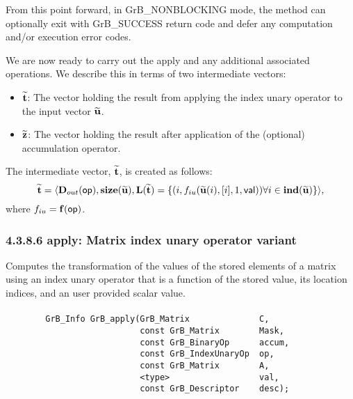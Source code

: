 From this point forward, in {\sf GrB\_NONBLOCKING} mode, the method can 
optionally exit with {\sf GrB\_SUCCESS} return code and defer any computation 
and/or execution error codes.

We are now ready to carry out the apply and any additional 
associated operations.  We describe this in terms of two intermediate vectors:
\begin{itemize}
    \item ${\bf \widetilde{t}}$: The vector holding the result from applying the index unary operator to the input vector
    ${\bf \widetilde{u}}$.
    \item ${\bf \widetilde{z}}$: The vector holding the result after 
    application of the (optional) accumulation operator.
\end{itemize}

{\color{red}
The intermediate vector, ${\bf \widetilde{t}}$, is created as follows:
\[
{\bf \widetilde{t}} = \langle
\mbox{$\mathbf{D}_{out}$}({\sf op}), \bold{size}({\bf \widetilde{u}}),
\bold{L}({\bf \widetilde{t}}) =
\{(i,f_{iu}({\bf \widetilde{u}}(i),[i],1,{\sf val})) \forall i \in \bold{ind}({\bf \widetilde{u}}) \} \rangle,
\]
where $f_{iu} = \mathbf{f}({\sf op})$.
}






\subsubsection*{4.3.8.6 {\sf apply}: Matrix index unary operator variant}

Computes the transformation of the values of the stored elements of a matrix
using an index unary operator that is a function of the stored value, its location 
indices, and an user provided scalar value.

\paragraph{\syntax}

\begin{verbatim}
        GrB_Info GrB_apply(GrB_Matrix              C,
                           const GrB_Matrix        Mask,
                           const GrB_BinaryOp      accum,
                           const GrB_IndexUnaryOp  op,
                           const GrB_Matrix        A,
                           <type>                  val,
                           const GrB_Descriptor    desc);
\end{verbatim}

